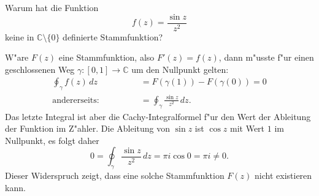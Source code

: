 Warum hat die Funktion
\[
f(z)=\frac{\sin z}{z^2}
\]
keine in $\mathbb C\setminus\{0\}$ definierte Stammfunktion?

\begin{loesung}
W"are $F(z)$ eine Stammfunktion, also $F'(z)=f(z)$,
dann m"usste f"ur einen geschlossenen
Weg $\gamma:[0,1]\to\mathbb C$ um den Nullpunkt gelten:
\begin{align*}
\oint_\gamma f(z)\,dz&=F(\gamma(1))-F(\gamma(0))=0
\\
\text{andererseits:}\qquad\qquad
&=
\oint_\gamma \frac{\sin z}{z^2}\,dz.
\end{align*}
Das letzte Integral ist aber die Cachy-Integralformel f"ur den Wert
der Ableitung der Funktion im Z"ahler. 
Die Ableitung von $\sin z$ ist $\cos z$ mit Wert $1$ im Nullpunkt,
es folgt daher
\[
0 = \oint_\gamma \frac{\sin z}{z^2}\,dz = \pi i \cos 0=\pi i\ne 0.
\]
Dieser Widerspruch zeigt, dass eine solche Stammfunktion $F(z)$ nicht
existieren kann.
\end{loesung}

